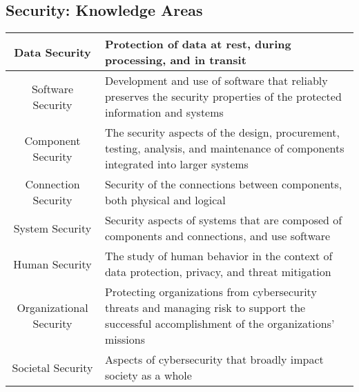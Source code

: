 \documentclass{math}
\begin{document}
\subsection*{Security: Knowledge Areas}
\begin{center}
  \begin{tabular}{|c|p{10cm}|}
    \hline
    Data Security & Protection of data at rest, during processing, and in
      transit \\
    \hline
    Software Security & Development and use of software that reliably preserves
      the security properties of the protected information and systems \\
    \hline
    Component Security & The security aspects of the design, procurement,
      testing, analysis, and maintenance of components integrated into larger
      systems \\
    \hline
    Connection Security & Security of the connections between components, both
      physical and logical \\
    \hline
    System Security & Security aspects of systems that are composed of
      components and connections, and use software \\
    \hline
    Human Security & The study of human behavior in the context of data
      protection, privacy, and threat mitigation \\
    \hline
    Organizational Security & Protecting organizations from cybersecurity
      threats and managing risk to support the successful accomplishment of the
      organizations' missions \\
    \hline
    Societal Security & Aspects of cybersecurity that broadly impact society as
      a whole \\
    \hline
  \end{tabular}
\end{center}
\end{document}
